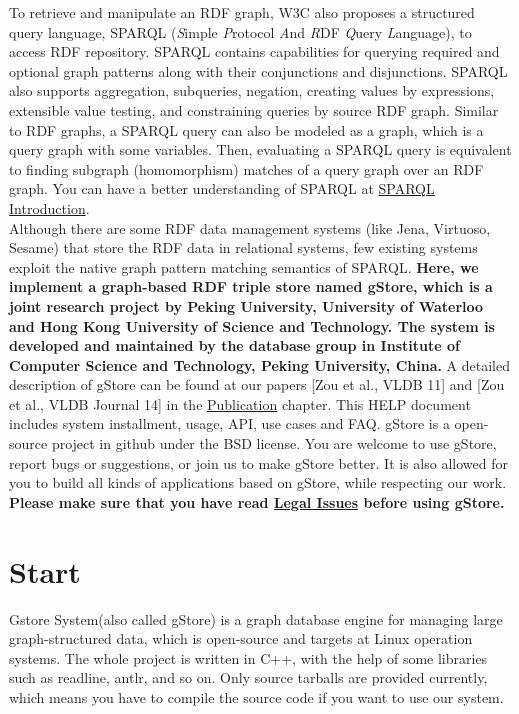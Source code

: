 \documentclass[titlepage, a4paper, 12pt]{article}
\begin{document}
To retrieve and manipulate an RDF graph, W3C also proposes a structured query language, SPARQL (\emph{S}imple \emph{P}rotocol \emph{A}nd \emph{R}DF \emph{Q}uery \emph{L}anguage), to access RDF repository. SPARQL contains capabilities for querying required and optional graph patterns along with their conjunctions and disjunctions. SPARQL also supports aggregation, subqueries, negation, creating values by expressions, extensible value testing, and constraining queries by source RDF graph. Similar to RDF graphs, a SPARQL query can also be modeled as a graph, which is a query graph with some variables. Then, evaluating a SPARQL query is equivalent to finding subgraph (homomorphism) matches of a query graph over an RDF graph. You can have a better understanding of SPARQL at \href{https://www.w3.org/TR/sparql11-query/}{SPARQL Introduction}.\\

Although there are some RDF data management systems (like Jena, Virtuoso, Sesame) that store the RDF data in relational systems, few existing systems exploit the native graph pattern
matching semantics of SPARQL. \textbf{Here, we implement a graph-based RDF triple store named gStore, which is a joint research project by Peking University, University of Waterloo and Hong Kong University of Science and Technology. The system is developed and maintained by the database group in Institute of Computer Science and Technology, Peking University, China.} A detailed description of gStore can be found at our papers {[}Zou et al., VLDB 11{]} and {[}Zou et al., VLDB Journal 14{]} in the \hyperref[chapter08]{Publication} chapter. This HELP document includes system installment, usage, API, use cases and FAQ. gStore is a open-source project in github under the BSD license. You are welcome to use gStore, report bugs or suggestions, or join us to make gStore better. It is also allowed for you to build all kinds of applications based on gStore, while respecting our work.\\



\textbf{Please make sure that you have read \hyperref[chapter17]{Legal Issues} before using gStore.}

\clearpage

\part{Start}

Gstore System(also called gStore) is a graph database engine for managing large graph-structured data, which is open-source and targets at Linux operation systems. The whole project is written in C++, with the help of some libraries such as readline, antlr, and so on. Only source tarballs are provided currently, which means you have to compile the source code if you want to use our system.
\end{document}
